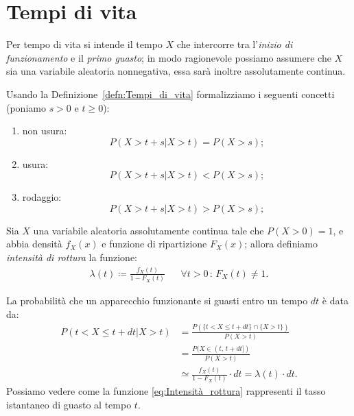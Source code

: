     \section{Tempi di vita}
    \begin{defn}\label{defn:Tempi_di_vita}
            Per tempo di vita si intende il tempo $X$ che intercorre tra l'\emph{inizio di funzionamento} e il \emph{primo guasto}; in modo ragionevole possiamo assumere che $X$ sia una variabile aleatoria non\nbdash negativa, essa sarà inoltre assolutamente continua.
        \end{defn}
        \begin{prty}\label{prty:Tempi_di_vita}
            Usando la Definizione~\ref{defn:Tempi_di_vita} formalizziamo i seguenti concetti (ponia\-mo $s > 0$ e $t \geq 0$):
            \begin{enumerate}
                \item non usura: \[\label{itm:Non_usura}
                        P(X > t + s | X > t)
                        = P(X > s)
                ;\] 
                \item usura: \[\label{itm:Usura}
                        P(X > t + s | X > t)
                        < P(X > s)
                ;\] 
                \item rodaggio: \[\label{itm:Rodaggio}
                        P(X > t + s | X > t)
                        > P(X > s)
                ;\] 
            \end{enumerate}
        \end{prty}
        \begin{defn}
            Sia $X$ una variabile aleatoria assolutamente continua tale che $P(X > 0) = 1$, e abbia densità $f_X(x)$ e funzione di ripartizione $F_X(x)$; allora definiamo \emph{intensità di rottura} la funzione:
            \begin{align}\label{eq:Intensità_rottura}
                \lambda(t) \coloneqq \frac{f_X(t)}{1 - F_X(t)} & & \forall t>0 \,:\, F_X(t) \neq 1
            .\end{align}
        \end{defn}
        \begin{obsv}
            La probabilità che un apparecchio funzionante si guasti entro un tempo $dt$ è data da:
            \begin{align*}
                P(t < X \leq t + dt | X > t) &= \frac{P(\{t < X \leq t + dt\} \cap \{X > t\})}{P(X > t)} \\
                                             &= \frac{P(X \in (t,\, t+dt])}{P(X > t)} \\
                                             &\simeq \frac{f_X(t)}{1 - F_X(t)} \cdot dt = \lambda(t)\cdot dt
            .\end{align*}
            Possiamo vedere come la funzione \eqref{eq:Intensità_rottura} rappresenti il tasso istantaneo di guasto al tempo $t$.
        \end{obsv}
